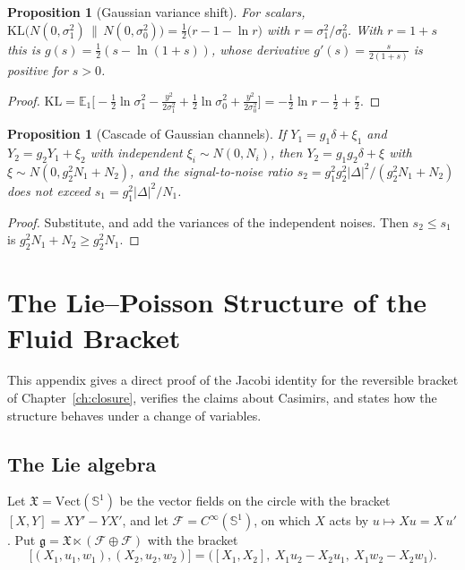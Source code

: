 \documentclass[11pt,oneside]{book}
\newtheorem{proposition}[theorem]{Proposition}
\theoremstyle{definition}
\theoremstyle{remark}
\begin{document}
\begin{proposition}[Gaussian variance shift]\label{prop:app-var}
For scalars, $\mathrm{KL}\bigl(N(0,\sigma_1^2)\,\|\,N(0,\sigma_0^2)\bigr)=\tfrac12\bigl(r-1-\ln r\bigr)$ with $r=\sigma_1^2/\sigma_0^2$. With $r=1+s$ this is $g(s)=\tfrac12(s-\ln(1+s))$, whose derivative $g'(s)=\tfrac{s}{2(1+s)}$ is positive for $s>0$.
\end{proposition}

\begin{proof}
$\mathrm{KL}=\mathbb E_1\bigl[-\tfrac12\ln\sigma_1^2-\tfrac{y^2}{2\sigma_1^2}+\tfrac12\ln\sigma_0^2+\tfrac{y^2}{2\sigma_0^2}\bigr]=-\tfrac12\ln r-\tfrac12+\tfrac r2$.
\end{proof}

\begin{proposition}[Cascade of Gaussian channels]\label{prop:app-cascade}
If $Y_1=g_1\delta+\xi_1$ and $Y_2=g_2Y_1+\xi_2$ with independent $\xi_i\sim N(0,N_i)$, then $Y_2=g_1g_2\delta+\xi$ with $\xi\sim N(0,g_2^2N_1+N_2)$, and the signal-to-noise ratio $s_2=g_1^2g_2^2|\Delta|^2/(g_2^2N_1+N_2)$ does not exceed $s_1=g_1^2|\Delta|^2/N_1$.
\end{proposition}

\begin{proof}
Substitute, and add the variances of the independent noises. Then $s_2\leq s_1$ is $g_2^2N_1+N_2\geq g_2^2N_1$.
\end{proof}

\chapter{The Lie--Poisson Structure of the Fluid Bracket}\label{app:liepoisson}

This appendix gives a direct proof of the Jacobi identity for the reversible bracket of Chapter~\ref{ch:closure}, verifies the claims about Casimirs, and states how the structure behaves under a change of variables.

\section*{The Lie algebra}

Let $\mathfrak X=\mathrm{Vect}(\mathbb S^1)$ be the vector fields on the circle with the bracket $[X,Y]=XY'-YX'$, and let $\mathcal F=C^\infty(\mathbb S^1)$, on which $X$ acts by $u\mapsto Xu=X\,u'$. Put $\mathfrak g=\mathfrak X\ltimes(\mathcal F\oplus\mathcal F)$ with the bracket
\[
\bigl[(X_1,u_1,w_1),(X_2,u_2,w_2)\bigr]=\bigl([X_1,X_2],\ X_1u_2-X_2u_1,\ X_1w_2-X_2w_1\bigr).
\]
\end{document}
